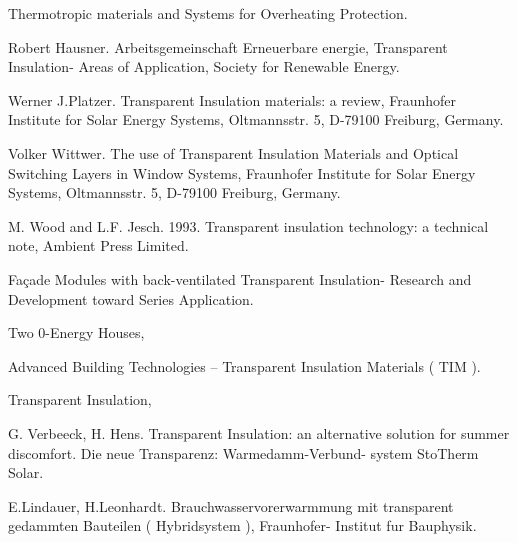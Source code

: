 Thermotropic materials and Systems for Overheating Protection.

Robert Hausner. Arbeitsgemeinschaft Erneuerbare energie, Transparent Insulation- Areas of Application, Society for Renewable Energy.

Werner J.Platzer. Transparent Insulation materials: a review, Fraunhofer Institute for Solar Energy Systems, Oltmannsstr. 5, D-79100 Freiburg, Germany.

Volker Wittwer. The use of Transparent Insulation Materials and Optical Switching Layers in Window Systems, Fraunhofer Institute for Solar Energy Systems, Oltmannsstr. 5, D-79100 Freiburg, Germany.

M. Wood and L.F. Jesch. 1993. Transparent insulation technology: a technical note, Ambient Press Limited.

Façade Modules with back-ventilated Transparent Insulation- Research and Development toward Series Application.

Two 0-Energy Houses,

Advanced Building Technologies -- Transparent Insulation Materials ( TIM ).

Transparent Insulation,

G. Verbeeck, H. Hens. Transparent Insulation: an alternative solution for summer discomfort. Die neue Transparenz: Warmedamm-Verbund- system StoTherm Solar.

E.Lindauer, H.Leonhardt. Brauchwasservorerwarmmung mit transparent gedammten Bauteilen ( Hybridsystem ), Fraunhofer- Institut fur Bauphysik.
